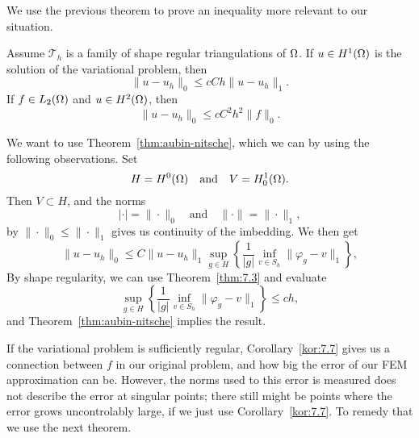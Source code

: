 We use the previous theorem to prove an inequality more relevant to our situation.
\begin{kor}{\quad\label{kor:7.7}}
   Assume $\mathcal{T}_h$ is a family of shape regular triangulations of $\Omega$.
   If $u\in H^1(\Omega)$ is the solution of the variational problem, then 
   \begin{equation*}
    \|u-u_h\|_0 \leq cCh \|u-u_h\|_1.
   \end{equation*}
   If $f\in L_2(\Omega)$ and $u\in H^2(\Omega)$, then 
   \begin{equation*}
    \|u-u_h\|_0 \leq cC^2h^2 \|f\|_0.
   \end{equation*}
\end{kor}
\begin{bev}
   We want to use Theorem~\ref{thm:aubin-nitsche}, which we can by 
   using the following observations. Set 
    \begin{equation*}
        H = H^0(\Omega) \quad \text{and} \quad V = H^1_0(\Omega).
    \end{equation*}
    Then $V \subset H$, and the norms 
    \begin{equation*}
        |\cdot| = \|\cdot\|_0 \quad \text{and} \quad \|\cdot\| = \|\cdot\|_1,
    \end{equation*}
    by $\|\cdot\|_0 \leq \|\cdot\|_1$ gives us continuity of the imbedding.
    We then get
    \begin{equation*}
        \|u-u_h\|_0 \leq C \|u-u_h\|_1 \sup_{g\in H} \left \{ \frac{1}{|g|} \inf_{v \in S_h} \|\varphi_g - v\|_1 \right \},
    \end{equation*}
    By shape regularity, we can use Theorem~\ref{thm:7.3} and evaluate 
    \begin{equation*}
        \sup_{g\in H} \left \{ \frac{1}{|g|} \inf_{v \in S_h} \|\varphi_g - v\|_1 \right \}
        \leq ch,
    \end{equation*}
    and Theorem~\ref{thm:aubin-nitsche} implies the result.
\end{bev}
If the variational problem is sufficiently regular,
Corollary~\ref{kor:7.7} gives us a connection between $f$ in our original problem, 
and how big the error of our FEM approximation can be. 
However, the norms used to this error is measured does not describe the error 
at singular points; there still might be points where the error grows uncontrolably large, 
if we just use Corollary~\ref{kor:7.7}. 
To remedy that we use the next theorem.